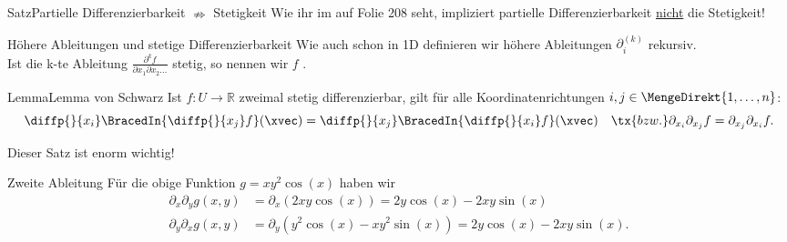 \begin{Satz}
{Satz}{Partielle Differenzierbarkeit $\nRightarrow$ Stetigkeit}
Wie ihr im \Skript{} auf Folie 208 seht, impliziert partielle Differenzierbarkeit \underline{nicht} die Stetigkeit!
\end{Satz}
\begin{Def}
{Höhere Ableitungen und stetige Differenzierbarkeit}
Wie auch schon in 1D definieren wir höhere Ableitungen $\partial_i^{(k)}$ rekursiv.\\
Ist die k-te Ableitung $\frac{\partial^k f}{\partial x_1\partial x_2\ldots}$ stetig, so nennen wir $f$ . 
\end{Def}
\begin{Satz}
{Lemma}{Lemma von Schwarz}
Ist $f:U\to\mathbb{R}$ zweimal stetig differenzierbar, gilt für alle Koordinatenrichtungen $i,j\in\MengeDirekt{1,\ldots,n}$:
\begin{equation}
    \diffp{}{x_i}\BracedIn{\diffp{}{x_j}f}(\xvec)=\diffp{}{x_j}\BracedIn{\diffp{}{x_i}f}(\xvec)\quad\tx{bzw. }\partial_{x_i}\partial_{x_j}f=\partial_{x_j}\partial_{x_i}f.
\end{equation}
\end{Satz}
Dieser Satz ist enorm wichtig!
\begin{Beispiel}
{Zweite Ableitung}
Für die obige Funktion $g=xy^2\cos(x)$ haben wir
\begin{align*}
    \partial_x\partial_y g(x,y)&=\partial_x(2xy\cos(x))=2y\cos(x)-2xy\sin(x)\\
    \partial_y\partial_x g(x,y)&=\partial_y(y^2\cos(x)-xy^2\sin(x))=2y\cos(x)-2xy\sin(x).
\end{align*}
\end{Beispiel}

